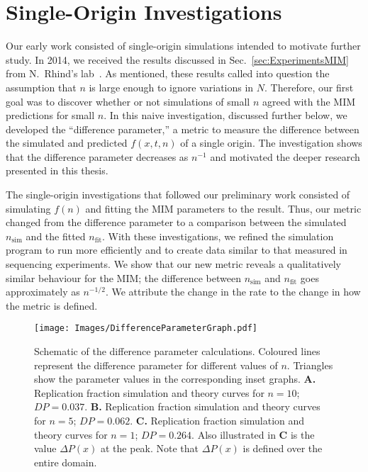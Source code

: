 	\section{Single-Origin Investigations}
	\label{sec:SingleOrigin}
	
	Our early work consisted of single-origin simulations intended to motivate further study.
	In 2014, we received the results discussed in Sec.~\ref{sec:ExperimentsMIM} from N.~Rhind's lab~\cite{Rhind}.
	As mentioned, these results called into question the assumption that $n$ is large enough to ignore variations in $N$.
	Therefore, our first goal was to discover whether or not simulations of small $n$ agreed with the MIM predictions for small $n$.
	In this naive investigation, discussed further below, we developed the ``difference parameter,'' a metric to measure the difference between the simulated and predicted $f(x,t,n)$ of a single origin.
	The investigation shows that the difference parameter decreases as $n^{-1}$ and motivated the deeper research presented in this thesis.
	
	The single-origin investigations that followed our preliminary work consisted of simulating $f(n)$ and fitting the MIM parameters to the result.
	Thus, our metric changed from the difference parameter to a comparison between the simulated $n_\text{sim}$ and the fitted $n_\text{fit}$.
	With these investigations, we refined the simulation program to run more efficiently and to create data similar to that measured in sequencing experiments.
	We show that our new metric reveals a qualitatively similar behaviour for the MIM; the difference between $n_\text{sim}$ and  $n_\text{fit}$ goes approximately as $n^{-1/2}$.
	We attribute the change in the rate to the change in how the metric is defined.
		
	\begin{figure}[tbh!]
		\begin{center}
			\texttt{[image: Images/DifferenceParameterGraph.pdf]}
		\end{center}
			\caption[Schematic of the Difference Parameter Calculations]{\label{fig:DifferenceParameter} Schematic of the difference parameter calculations.
				Coloured lines represent the difference parameter for different values of $n$.
				Triangles show the parameter values in the corresponding inset graphs.
				\textbf{A.} Replication fraction simulation and theory curves for $n=10$; $DP=0.037$.
				\textbf{B.} Replication fraction simulation and theory curves for $n=5$; $DP = 0.062$.
				\textbf{C.} Replication fraction simulation and theory curves for $n=1$; $DP = 0.264$.
				Also illustrated in \textbf{C} is the value $\Delta P(x)$ at the peak.
				Note that $\Delta P(x)$ is defined over the entire domain.
				}
	\end{figure}
	
